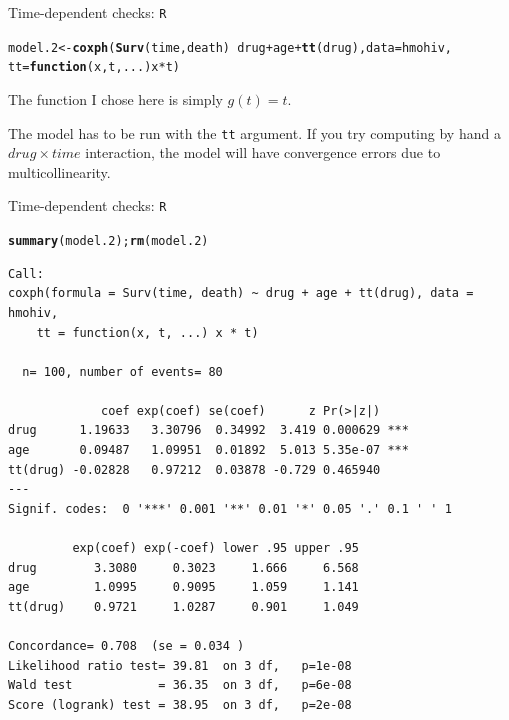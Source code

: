 \documentclass[12pt,english,pdf,xcolor=dvipsnames,aspectratio=169,handout]{beamer}\usepackage[]{graphicx}\usepackage[]{xcolor}
\makeatletter
\newcommand{\hlopt}[1]{\textcolor[rgb]{0,0,0}{#1}}%
\newcommand{\hlstd}[1]{\textcolor[rgb]{0.345,0.345,0.345}{#1}}%
\newcommand{\hlkwa}[1]{\textcolor[rgb]{0.161,0.373,0.58}{\textbf{#1}}}%
\newcommand{\hlkwb}[1]{\textcolor[rgb]{0.69,0.353,0.396}{#1}}%
\newcommand{\hlkwc}[1]{\textcolor[rgb]{0.333,0.667,0.333}{#1}}%
\newcommand{\hlkwd}[1]{\textcolor[rgb]{0.737,0.353,0.396}{\textbf{#1}}}%
\newenvironment{kframe}{%
 \def\at@end@of@kframe{}%
 \ifinner\ifhmode%
  \def\at@end@of@kframe{\end{minipage}}%
  \begin{minipage}{\columnwidth}%
 \fi\fi%
 \def\FrameCommand##1{\hskip\@totalleftmargin \hskip-\fboxsep
 \colorbox{shadecolor}{##1}\hskip-\fboxsep
     \hskip-\linewidth \hskip-\@totalleftmargin \hskip\columnwidth}%
 \MakeFramed {\advance\hsize-\width
   \@totalleftmargin\z@ \linewidth\hsize
   \@setminipage}}%
 {\par\unskip\endMakeFramed%
 \at@end@of@kframe}
\newenvironment{knitrout}{}{} %
\makeatother
\begin{document}
\begin{frame}[fragile]{Time-dependent checks: \texttt{R}}
\begin{knitrout}\scriptsize
{}\color{fgcolor}\begin{kframe}
\begin{alltt}
\hlstd{model.2} \hlkwb{<-} \hlkwd{coxph}\hlstd{(}\hlkwd{Surv}\hlstd{(time, death)} \hlopt{~} \hlstd{drug} \hlopt{+} \hlstd{age} \hlopt{+} \hlkwd{tt}\hlstd{(drug),} \hlkwc{data} \hlstd{= hmohiv,}
                 \hlkwc{tt}\hlstd{=}\hlkwa{function}\hlstd{(}\hlkwc{x}\hlstd{,} \hlkwc{t}\hlstd{,} \hlkwc{...}\hlstd{) x} \hlopt{*} \hlstd{t)}
\end{alltt}
\end{kframe}
\end{knitrout}

The function I chose here is simply $g(t)=t$.\bigskip

The model has to be run with the \texttt{tt} argument. If you try computing by hand a $drug \times time$ interaction, the model will have convergence errors due to multicollinearity.

\end{frame}



\begin{frame}[fragile]{Time-dependent checks: \texttt{R}}
\begin{knitrout}\tiny
{}\color{fgcolor}\begin{kframe}
\begin{alltt}
\hlkwd{summary}\hlstd{(model.2);} \hlkwd{rm}\hlstd{(model.2)}
\end{alltt}
\begin{verbatim}
Call:
coxph(formula = Surv(time, death) ~ drug + age + tt(drug), data = hmohiv, 
    tt = function(x, t, ...) x * t)

  n= 100, number of events= 80 

             coef exp(coef) se(coef)      z Pr(>|z|)    
drug      1.19633   3.30796  0.34992  3.419 0.000629 ***
age       0.09487   1.09951  0.01892  5.013 5.35e-07 ***
tt(drug) -0.02828   0.97212  0.03878 -0.729 0.465940    
---
Signif. codes:  0 '***' 0.001 '**' 0.01 '*' 0.05 '.' 0.1 ' ' 1

         exp(coef) exp(-coef) lower .95 upper .95
drug        3.3080     0.3023     1.666     6.568
age         1.0995     0.9095     1.059     1.141
tt(drug)    0.9721     1.0287     0.901     1.049

Concordance= 0.708  (se = 0.034 )
Likelihood ratio test= 39.81  on 3 df,   p=1e-08
Wald test            = 36.35  on 3 df,   p=6e-08
Score (logrank) test = 38.95  on 3 df,   p=2e-08
\end{verbatim}
\end{kframe}
\end{knitrout}

\end{frame}
\end{document}
